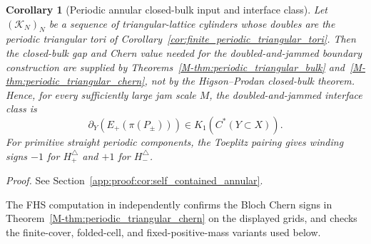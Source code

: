 \documentclass[11pt]{article}
\numberwithin{equation}{section}
\newtheorem{corollary}[theorem]{Corollary}
\theoremstyle{definition}
\theoremstyle{remark}
\newcommand{\proofref}[1]{%
  \par\noindent\emph{Proof.} See Section~\ref{#1}.\par\medskip
}
\newcommand{\proofappendixref}[1]{\proofref{#1}}
\newcommand{\K}{\mathcal{K}}
\begin{document}
\begin{corollary}[Periodic annular closed-bulk input and interface class]\label{cor:self_contained_annular}
Let \((\K_N)_N\) be a sequence of triangular-lattice cylinders whose doubles are the periodic
triangular tori of Corollary~\ref{cor:finite_periodic_triangular_tori}. Then the closed-bulk gap
and Chern value needed for the doubled-and-jammed boundary construction are supplied by
Theorems~\ref{M-thm:periodic_triangular_bulk}
and~\ref{M-thm:periodic_triangular_chern}, not by the Higson--Prodan closed-bulk theorem. Hence, for
every sufficiently large jam scale \(M\), the doubled-and-jammed interface class is
\[
\partial_Y(E_+(\pi(P_\pm)))\in K_1(C^*(Y\subset X)).
\]
For primitive straight periodic components, the Toeplitz pairing gives winding signs \(-1\) for
\(H_+^\triangle\) and \(+1\) for \(H_-^\triangle\).
\end{corollary}
\proofappendixref{app:proof:cor:self_contained_annular}




The FHS computation in  independently confirms the Bloch
Chern signs in Theorem~\ref{M-thm:periodic_triangular_chern} on the displayed grids, and
 checks the finite-cover, folded-cell, and
fixed-positive-mass variants used below.
\end{document}
